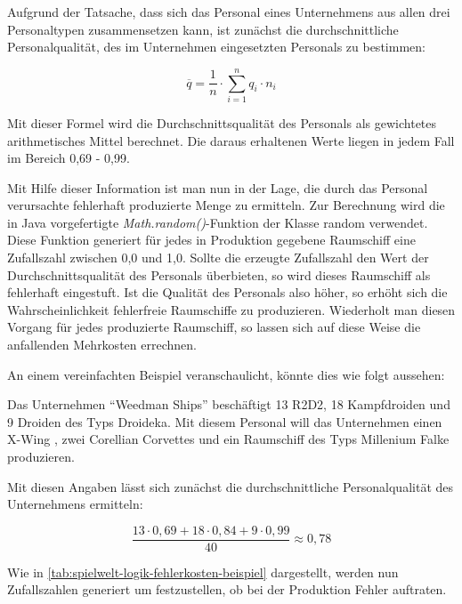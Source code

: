 Aufgrund der Tatsache, dass sich das Personal eines Unternehmens aus allen drei Personaltypen
zusammensetzen kann, ist zunächst die durchschnittliche Personalqualität, des im Unternehmen
eingesetzten Personals zu bestimmen:

\begin{equation}
     \overline{q} = \frac{1}{n} \cdot \sum\limits_{i=1}^n {q_i \cdot n_i}
     \label{alg:spielwelt-logik-fehlerkosten-1}
\end{equation}

Mit dieser Formel wird die Durchschnittsqualität des Personals als gewichtetes arithmetisches Mittel
berechnet. Die daraus erhaltenen Werte liegen in jedem Fall im Bereich 0,69 - 0,99.

Mit Hilfe dieser Information ist man nun in der Lage, die durch das Personal verursachte fehlerhaft
produzierte Menge zu ermitteln. Zur Berechnung wird die in Java vorgefertigte \textit{Math.random()}-Funktion
der Klasse random verwendet. Diese Funktion generiert für jedes in Produktion gegebene Raumschiff eine
Zufallszahl zwischen 0,0 und 1,0. Sollte die erzeugte Zufallszahl den Wert der Durchschnittsqualität
des Personals überbieten, so wird dieses Raumschiff als fehlerhaft eingestuft. Ist die Qualität des
Personals also höher, so erhöht sich die Wahrscheinlichkeit fehlerfreie Raumschiffe zu produzieren.
Wiederholt man diesen Vorgang für jedes produzierte Raumschiff, so lassen sich auf diese Weise die
anfallenden Mehrkosten errechnen.

\bigskip

An einem vereinfachten Beispiel veranschaulicht, könnte dies wie folgt aussehen:

Das Unternehmen “Weedman Ships” beschäftigt 13 R2D2, 18 Kampfdroiden und 9 Droiden des Typs Droideka.
Mit diesem Personal will das Unternehmen einen X-Wing , zwei Corellian Corvettes und ein Raumschiff
des Typs Millenium Falke produzieren.

Mit diesen Angaben lässt sich zunächst die durchschnittliche Personalqualität des Unternehmens ermitteln:

\begin{equation}
     \frac{13 \cdot 0,69 + 18 \cdot 0,84 + 9 \cdot 0,99}{40} \approx 0,78 \nonumber
     \label{alg:spielwelt-logik-fehlerkosten-Beispiel}
\end{equation}

Wie in \ref{tab:spielwelt-logik-fehlerkosten-beispiel} dargestellt, werden nun Zufallszahlen generiert um
festzustellen, ob bei der Produktion Fehler auftraten.

